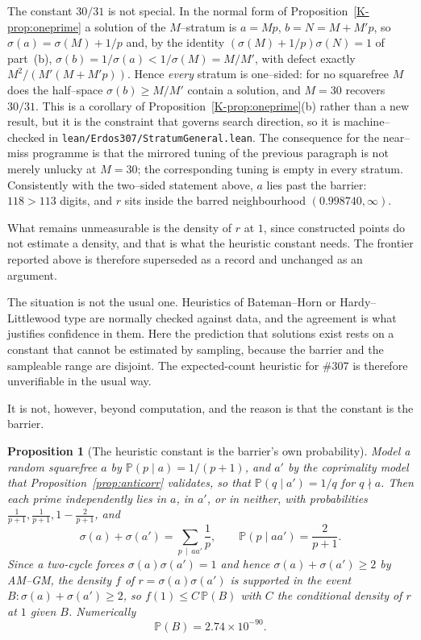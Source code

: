 \documentclass[11pt]{article}
\newtheorem{proposition}[theorem]{Proposition}
\theoremstyle{definition}
\begin{document}
The constant $30/31$ is not special. In the normal form of Proposition~\ref{K-prop:oneprime} a solution
of the $M$--stratum is $a=Mp$, $b=N=M+M'p$, so $\sigma(a)=\sigma(M)+1/p$ and, by the identity
$(\sigma(M)+1/p)\sigma(N)=1$ of part~(b), $\sigma(b)=1/\sigma(a)<1/\sigma(M)=M/M'$, with defect
exactly $M^2/(M'(M+M'p))$. Hence \emph{every} stratum is one--sided: for no squarefree $M$ does the
half--space $\sigma(b)\ge M/M'$ contain a solution, and $M=30$ recovers $30/31$. This is a corollary
of Proposition~\ref{K-prop:oneprime}(b) rather than a new result, but it is the constraint that governs
search direction, so it is machine--checked in \texttt{lean/Erdos307/StratumGeneral.lean}. The
consequence for the near--miss programme is that the mirrored tuning of the previous paragraph is not
merely unlucky at $M=30$; the corresponding tuning is empty in every stratum. Consistently with the two--sided statement above, $a$
lies past the barrier: $118>113$ digits, and $r$ sits inside the barred neighbourhood
$(0.998740,\infty)$.

What remains unmeasurable is the density of $r$ at $1$,
since constructed points do not estimate a density, and that is what the heuristic constant needs.
The frontier reported above is therefore superseded as a record and unchanged as an argument.

The situation is not the usual one. Heuristics of Bateman--Horn or Hardy--Littlewood
type are normally checked against data, and the agreement is what justifies confidence in them. Here
the prediction that solutions exist rests on a constant that cannot be estimated by sampling,
because the barrier and the sampleable range are disjoint. The expected-count heuristic for \#307 is
therefore unverifiable in the usual way.

It is not, however, beyond computation, and the reason is that the constant is the barrier.

\begin{proposition}[The heuristic constant is the barrier's own probability]\label{prop:f1}
Model a random squarefree $a$ by $\mathbb{P}(p\mid a)=1/(p+1)$, and $a'$ by the coprimality model
that Proposition~\textup{\ref{prop:anticorr}} validates, so that $\mathbb{P}(q\mid a')=1/q$ for
$q\nmid a$. Then each prime independently lies in $a$, in $a'$, or in neither, with probabilities
$\tfrac1{p+1},\tfrac1{p+1},1-\tfrac2{p+1}$, and
\[ \sigma(a)+\sigma(a')=\sum_{p\,\mid\,aa'}\frac1p,\qquad \mathbb{P}(p\mid aa')=\frac2{p+1}. \]
Since a two-cycle forces $\sigma(a)\sigma(a')=1$ and hence $\sigma(a)+\sigma(a')\ge2$ by
\textup{AM--GM}, the density $f$ of $r=\sigma(a)\sigma(a')$ is supported in the event
$B:\sigma(a)+\sigma(a')\ge2$, so $f(1)\le C\,\mathbb{P}(B)$ with $C$ the conditional density of $r$
at $1$ given $B$. Numerically
\[ \mathbb{P}(B)=2.74\times10^{-90}. \]
\end{proposition}
\end{document}
